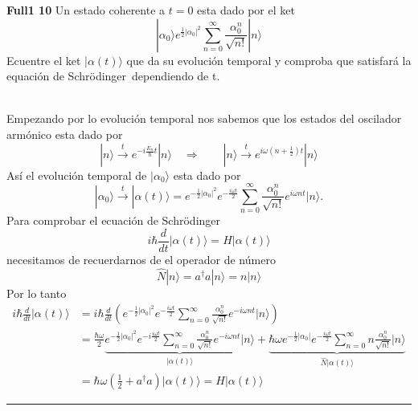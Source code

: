 	
\begin{ejercicio}
\textbf{Full1 10} Un estado coherente a $t=0$ esta dado por el ket
$$
	| \alpha_0 \rangle e^{\frac{1}{2} |\alpha_0|^2} \sum_{n=0}^{\infty}
	\frac{\alpha_0^n}{\sqrt{n!}} |n\rangle 
$$
Ecuentre el ket $|\alpha(t)\rangle$ que da su evolución temporal y comproba que
satisfará la equación de Schrödinger dependiendo de t. \\\\
\end{ejercicio}
Empezando por lo evolución temporal nos sabemos que los estados del oscilador
armónico esta dado por
$$	
	|n\rangle \overset{t}{\longrightarrow} e^{-i\frac{E_n}{\hbar}t} |n\rangle
\quad \Rightarrow \qquad |n\rangle \overset{t}{\longrightarrow} e^{i\omega(n +
\frac{1}{2}) t} |n\rangle
$$
Así el evolución temporal de $|\alpha_0\rangle$ esta dado por
$$
	|\alpha_0\rangle \overset{t}{\longrightarrow} |\alpha(t) \rangle =
e^{-\frac{1}{2} |\alpha_0|^2} e^{-\frac{i\omega t}{2}} \sum_{n=0}^{\infty}
\frac{\alpha_0^n}{\sqrt{n!}} e^{i\omega n t} |n\rangle.
$$
Para comprobar el ecuación de Schrödinger
$$
	i \hbar \frac{d}{dt} |\alpha(t) \rangle = H | \alpha(t) \rangle
$$
necesitamos de recuerdarnos de el operador de número
$$
	\hat N | n \rangle = a^\dagger a | n\rangle = n | n \rangle
$$ 
Por lo tanto 
\begin{align*}
	i \hbar \frac{d}{dt} |\alpha(t) \rangle &= i \hbar
\frac{d}{dt} \left(e^{-\frac{1}{2} |\alpha_0|^2} e^{-\frac{i \omega t}{2}} \sum_{n=0}^{\infty}
\frac{\alpha_0^n}{\sqrt{n!}} e^{-i\omega n t} | n\rangle \right) \\
	&= \frac{\hbar \omega}{2} \underbrace{e^{-\frac{1}{2}|\alpha_0|^2}
e^{-i\frac{i \omega t}{2}} \sum_{n=0}^\infty \frac{\alpha_0^n}{\sqrt{n!}}
e^{-i\omega n t} | n\rangle}_{|\alpha(t)\rangle} + \underbrace{\hbar \omega
e^{-\frac{1}{2} |\alpha_0|} e^{-\frac{i\omega t}{2}} \sum_{n=0}^\infty n
\frac{\alpha_0^n}{\sqrt{n!}}|n\rangle}_{\hat N | \alpha(t) \rangle}  \\
	&= \hbar \omega \left(\frac{1}{2} + a^\dagger a \right) |\alpha(t)\rangle = H | \alpha(t) \rangle
\end{align*}
\rule{\textwidth}{1pt}

